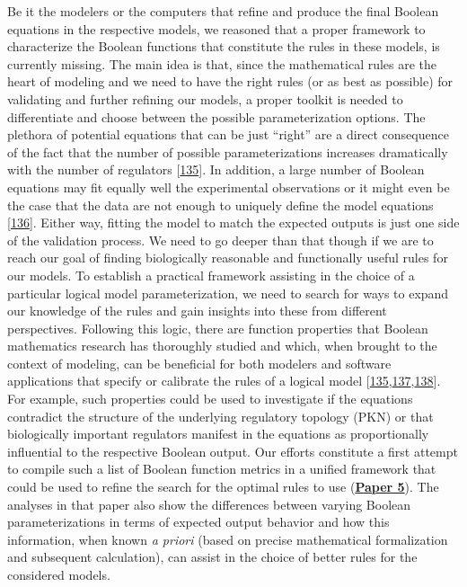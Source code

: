 \documentclass[
  12pt,
]{book}
\begin{document}
Be it the modelers or the computers that refine and produce the final Boolean equations in the respective models, we reasoned that a proper framework to characterize the Boolean functions that constitute the rules in these models, is currently missing.
The main idea is that, since the mathematical rules are the heart of modeling and we need to have the right rules (or as best as possible) for validating and further refining our models, a proper toolkit is needed to differentiate and choose between the possible parameterization options.
The plethora of potential equations that can be just ``right'' are a direct consequence of the fact that the number of possible parameterizations increases dramatically with the number of regulators {[}\protect\hyperlink{ref-Cury2019}{135}{]}.
In addition, a large number of Boolean equations may fit equally well the experimental observations or it might even be the case that the data are not enough to uniquely define the model equations {[}\protect\hyperlink{ref-Saez-Rodriguez2009}{136}{]}.
Either way, fitting the model to match the expected outputs is just one side of the validation process.
We need to go deeper than that though if we are to reach our goal of finding biologically reasonable and functionally useful rules for our models.
To establish a practical framework assisting in the choice of a particular logical model parameterization, we need to search for ways to expand our knowledge of the rules and gain insights into these from different perspectives.
Following this logic, there are function properties that Boolean mathematics research has thoroughly studied and which, when brought to the context of modeling, can be beneficial for both modelers and software applications that specify or calibrate the rules of a logical model {[}\protect\hyperlink{ref-Cury2019}{135},\protect\hyperlink{ref-Shmulevich2004}{137},\protect\hyperlink{ref-Gherardi2016}{138}{]}.
For example, such properties could be used to investigate if the equations contradict the structure of the underlying regulatory topology (PKN) or that biologically important regulators manifest in the equations as proportionally influential to the respective Boolean output.
Our efforts constitute a first attempt to compile such a list of Boolean function metrics in a unified framework that could be used to refine the search for the optimal rules to use (\textbf{\protect\hyperlink{Paper5}{Paper 5}}).
The analyses in that paper also show the differences between varying Boolean parameterizations in terms of expected output behavior and how this information, when known \emph{a priori} (based on precise mathematical formalization and subsequent calculation), can assist in the choice of better rules for the considered models.
\end{document}
